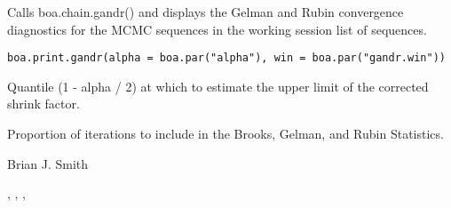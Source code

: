 \begin{Description}\relax
Calls boa.chain.gandr() and displays the Gelman and Rubin convergence 
diagnostics for the MCMC sequences in the working session list of sequences.
\end{Description}
\begin{Usage}
\begin{verbatim}
boa.print.gandr(alpha = boa.par("alpha"), win = boa.par("gandr.win"))
\end{verbatim}
\end{Usage}
\begin{Arguments}
\begin{ldescription}
\item[\code{alpha}] Quantile (1 - alpha / 2) at which to estimate the upper limit of 
the corrected shrink factor.
\item[\code{win}] Proportion of iterations to include in the Brooks, Gelman, and 
Rubin Statistics.
\end{ldescription}
\end{Arguments}
\begin{Author}\relax
Brian J. Smith
\end{Author}
\begin{SeeAlso}\relax
{}, ,
, 
\end{SeeAlso}

